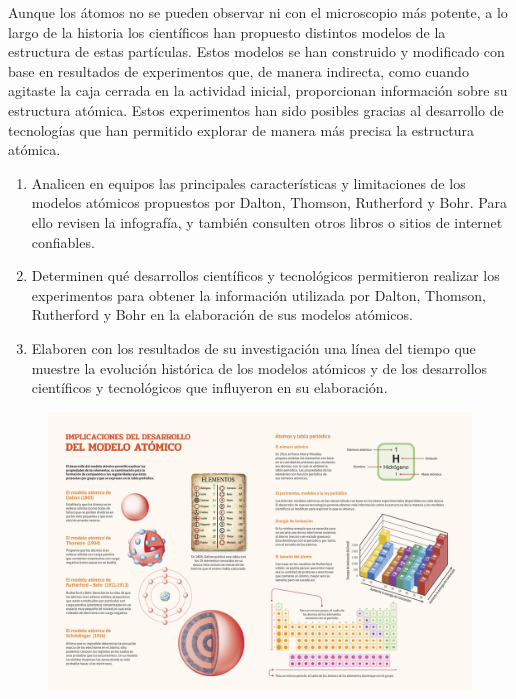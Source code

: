 \documentclass[11pt]{book}
\begin{document}
\begin{boxK}

  \begin{boxF}
    Aunque los átomos no se pueden observar ni con el microscopio más potente,
    a lo largo de la historia los científicos han propuesto distintos modelos
    de la estructura de estas partículas. Estos modelos se han construido y
    modificado con base en resultados de experimentos que, de manera indirecta,
    como cuando agitaste la caja cerrada en la actividad inicial, proporcionan
    información sobre su estructura atómica. Estos experimentos han sido posibles
    gracias al desarrollo de tecnologías que han permitido explorar de manera
    más precisa la estructura atómica.
  \end{boxF}
  \begin{enumerate}
    \item Analicen en equipos las principales características y limitaciones
          de los modelos atómicos propuestos por Dalton, Thomson, Rutherford y Bohr.
          Para ello revisen la infografía, y también consulten otros libros o sitios
          de internet confiables.
    \item Determinen qué desarrollos científicos y tecnológicos permitieron
          realizar los experimentos para obtener la información utilizada por Dalton,
          Thomson, Rutherford y Bohr en la elaboración de sus modelos atómicos.
    \item Elaboren con los resultados de su investigación una línea del tiempo que
          muestre la evolución histórica de los modelos atómicos y de los desarrollos
          científicos y tecnológicos que influyeron en su elaboración.
  \end{enumerate}
\end{boxK}
\newpage
\begin{landscape}
  \thispagestyle{plain}
  \begin{figure}[H]
    \centering
    \includegraphics[width=\paperwidth]{SINQU3SB_1E16_U2_S7_114_115_INF.png}
    \label{fig:SINFI2SB_1E16_U1_S4_b_info}
  \end{figure}
\end{landscape}
\end{document}
